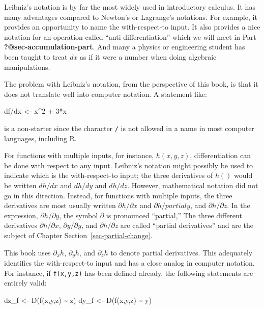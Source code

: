 \documentclass[
  letterpaper,
  DIV=11,
  numbers=noendperiod,
  oneside]{scrreprt}
\newenvironment{Shaded}{\begin{snugshade}}{\end{snugshade}}
\newcommand{\DecValTok}[1]{\textcolor[rgb]{0.68,0.00,0.00}{#1}}
\newcommand{\FunctionTok}[1]{\textcolor[rgb]{0.28,0.35,0.67}{#1}}
\newcommand{\NormalTok}[1]{\textcolor[rgb]{0.00,0.46,0.62}{#1}}
\newcommand{\OtherTok}[1]{\textcolor[rgb]{0.00,0.46,0.62}{#1}}
\newcommand{\SpecialCharTok}[1]{\textcolor[rgb]{0.37,0.37,0.37}{#1}}
\begin{document}
Leibniz's notation is by far the most widely used in introductory
calculus. It has many advantages compared to Newton's or Lagrange's
notations. For example, it provides an opportunity to name the
with-respect-to input. It also provides a nice notation for an operation
called ``anti-differentiation'' which we will meet in Part
\textbf{?@sec-accumulation-part}. And many a physics or engineering
student has been taught to treat \(dx\) as if it were a number when
doing algebraic manipulations.

The problem with Leibniz's notation, from the perspective of this book,
is that it does not translate well into computer notation. A statement
like:

\begin{Shaded}
\begin{Highlighting}[]
\NormalTok{df}\SpecialCharTok{/}\NormalTok{dx }\OtherTok{\textless{}{-}}\NormalTok{ x}\SpecialCharTok{\^{}}\DecValTok{2} \SpecialCharTok{+} \DecValTok{3}\SpecialCharTok{*}\NormalTok{x}
\end{Highlighting}
\end{Shaded}

is a non-starter since the character \texttt{/} is not allowed in a name
in most computer languages, including R.

For functions with multiple inputs, for instance, \(h(x,y,z)\),
differentiation can be done with respect to any input. Leibniz's
notation might possibly be used to indicate which is the with-respect-to
input; the three derivatives of \(h()\) would be written \(dh/dx\) and
\(dh/dy\) and \(dh/dz\). However, mathematical notation did not go in
this direction. Instead, for functions with multiple inputs, the three
derivatives are most usually written \(\partial h/\partial x\) and
\(\partial h/partial y\), and \(\partial h/\partial z\). In the
expression, \(\partial h/\partial y\), the symbol \(\partial\) is
pronounced ``partial,'' The three different derivatives
\(\partial h/\partial x\), \(\partial y /\partial y\), and
\(\partial h/\partial z\) are called ``partial derivatives'' and are the
subject of Chapter Section~\ref{sec-partial-change}.

This book uses \(\partial_x h\), \(\partial_y h\), and \(\partial_z h\)
to denote partial derivatives. This adequately identifies the
with-respect-to input and has a close analog in computer notation. For
instance, if \texttt{f(x,y,z)} has been defined already, the following
statements are entirely valid:

\begin{Shaded}
\begin{Highlighting}[]
\NormalTok{dz\_f }\OtherTok{\textless{}{-}} \FunctionTok{D}\NormalTok{(}\FunctionTok{f}\NormalTok{(x,y,z) }\SpecialCharTok{\textasciitilde{}}\NormalTok{ z)}
\NormalTok{dy\_f }\OtherTok{\textless{}{-}} \FunctionTok{D}\NormalTok{(}\FunctionTok{f}\NormalTok{(x,y,z) }\SpecialCharTok{\textasciitilde{}}\NormalTok{ y)}
\end{Highlighting}
\end{Shaded}
\end{document}
